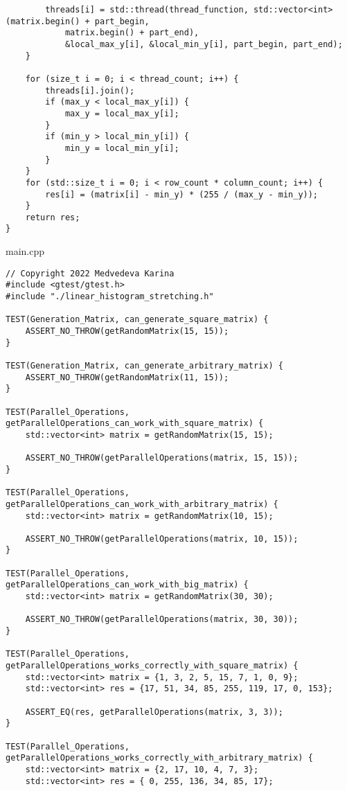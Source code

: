 \documentclass{report}
\begin{document}
\begin{lstlisting}
        threads[i] = std::thread(thread_function, std::vector<int>(matrix.begin() + part_begin,
            matrix.begin() + part_end),
            &local_max_y[i], &local_min_y[i], part_begin, part_end);
    }

    for (size_t i = 0; i < thread_count; i++) {
        threads[i].join();
        if (max_y < local_max_y[i]) {
            max_y = local_max_y[i];
        }
        if (min_y > local_min_y[i]) {
            min_y = local_min_y[i];
        }
    }
    for (std::size_t i = 0; i < row_count * column_count; i++) {
        res[i] = (matrix[i] - min_y) * (255 / (max_y - min_y));
    }
    return res;
}
\end{lstlisting}

\par main.cpp
\begin{lstlisting}
// Copyright 2022 Medvedeva Karina
#include <gtest/gtest.h>
#include "./linear_histogram_stretching.h"

TEST(Generation_Matrix, can_generate_square_matrix) {
    ASSERT_NO_THROW(getRandomMatrix(15, 15));
}

TEST(Generation_Matrix, can_generate_arbitrary_matrix) {
    ASSERT_NO_THROW(getRandomMatrix(11, 15));
}

TEST(Parallel_Operations, getParallelOperations_can_work_with_square_matrix) {
    std::vector<int> matrix = getRandomMatrix(15, 15);

    ASSERT_NO_THROW(getParallelOperations(matrix, 15, 15));
}

TEST(Parallel_Operations, getParallelOperations_can_work_with_arbitrary_matrix) {
    std::vector<int> matrix = getRandomMatrix(10, 15);

    ASSERT_NO_THROW(getParallelOperations(matrix, 10, 15));
}

TEST(Parallel_Operations, getParallelOperations_can_work_with_big_matrix) {
    std::vector<int> matrix = getRandomMatrix(30, 30);

    ASSERT_NO_THROW(getParallelOperations(matrix, 30, 30));
}

TEST(Parallel_Operations, getParallelOperations_works_correctly_with_square_matrix) {
    std::vector<int> matrix = {1, 3, 2, 5, 15, 7, 1, 0, 9};
    std::vector<int> res = {17, 51, 34, 85, 255, 119, 17, 0, 153};

    ASSERT_EQ(res, getParallelOperations(matrix, 3, 3));
}

TEST(Parallel_Operations, getParallelOperations_works_correctly_with_arbitrary_matrix) {
    std::vector<int> matrix = {2, 17, 10, 4, 7, 3};
    std::vector<int> res = { 0, 255, 136, 34, 85, 17};


\end{lstlisting}
\end{document}
